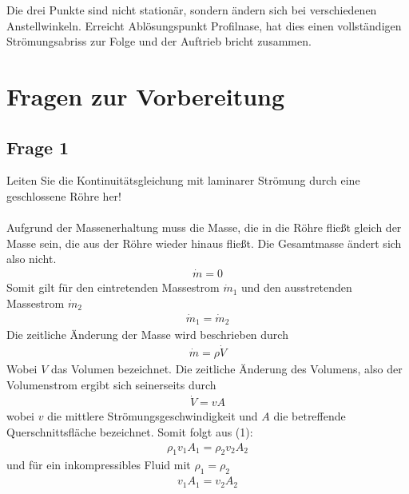 \documentclass[a4paper,10pt]{scrartcl}
\begin{document}
				Die drei Punkte sind nicht stationär, sondern ändern sich bei verschiedenen Anstellwinkeln. Erreicht Ablösungspunkt Profilnase, hat dies einen vollständigen Strömungsabriss zur Folge und der Auftrieb bricht zusammen.
		
	\section{Fragen zur Vorbereitung}
		\subsection{Frage 1}
			Leiten Sie die Kontinuitätsgleichung mit laminarer Strömung durch eine geschlossene Röhre
			her!\\
			\\
			Aufgrund der Massenerhaltung muss die Masse, die in die Röhre fließt gleich der Masse sein, die aus der Röhre wieder hinaus fließt. Die Gesamtmasse ändert sich also nicht.
			\begin{align*}
			\dot m=0
			\end{align*}
			Somit gilt für den eintretenden Massestrom \(\dot m_{1}\) und den ausstretenden Massestrom \(\dot m_{2}\)
			\begin{align}
			\dot m_{1}=\dot m_{2}
			\end{align}
			Die zeitliche Änderung der Masse wird beschrieben durch 
			\begin{align*}
			\dot m=\rho \dot V
			\end{align*}
			Wobei \(V\) das Volumen bezeichnet. Die zeitliche Änderung des Volumens, also der Volumenstrom ergibt sich seinerseits durch
			\begin{align*}
			\dot V=vA
			\end{align*}
			wobei \(v\) die mittlere Strömungsgeschwindigkeit und \(A\) die betreffende Querschnittsfläche bezeichnet. Somit folgt aus (1):
			\begin{align*}
			\rho_{1}v_{1}A_{1}=\rho_{2}v_{2}A_{2}
			\end{align*}
			und für ein inkompressibles Fluid mit \(\rho_{1}=\rho_{2}\)
			\begin{align*}
			v_{1}A_{1}=v_{2}A_{2}
			\end{align*}
			
\end{document}
